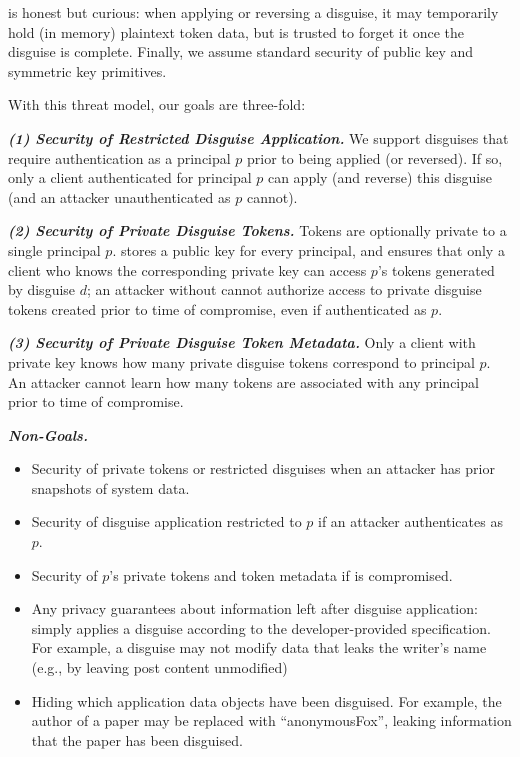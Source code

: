 \sys is honest but curious: when applying or reversing a disguise, it may temporarily
hold (in memory) plaintext token data, but is trusted to forget it once the disguise is complete.
Finally, we assume standard security of public key and symmetric key primitives.

With this threat model, our goals are three-fold: 

\vspace{6pt}\noindent\textbf{\emph{(1) Security of Restricted Disguise Application.}}
We support disguises that require authentication as a principal $p$ prior to being applied (or
reversed). If so, only a client authenticated for principal $p$ can apply (and reverse) this
disguise (and an attacker unauthenticated as $p$ cannot).

\vspace{6pt}\noindent\textbf{\emph{(2) Security of Private Disguise Tokens.}}
Tokens are optionally private to a single principal $p$. 
\sys stores a public key  for every principal, and ensures that 
only a client who knows the corresponding private key  can access $p$'s tokens generated by
disguise $d$; an attacker without  cannot authorize access to private disguise tokens
created prior to time of compromise, even if authenticated as $p$.

\vspace{6pt}\noindent\textbf{\emph{(3) Security of Private Disguise Token Metadata.}}
Only a client with private key  knows how many private disguise tokens correspond to
principal $p$. An attacker cannot learn how many tokens are associated with any principal prior to
time of compromise.

\vspace{6pt}\noindent\textbf{\emph{Non-Goals.}}
\begin{itemize}
    \item Security of private tokens or restricted disguises when an attacker has prior snapshots of system data.
    \item Security of disguise application restricted to $p$ if an attacker authenticates as $p$.
    \item Security of $p$'s private tokens and token metadata if  is compromised.  
    \item Any privacy guarantees about information left after disguise application: \sys 
        simply applies a disguise according to the developer-provided specification.
        For example, a disguise may not modify data that leaks the writer's name (e.g., by leaving post content unmodified)
    \item Hiding which application data objects have been disguised. For example, the author of a
        paper may be replaced with ``anonymousFox'', leaking information that the paper has been
        disguised.
\end{itemize}

